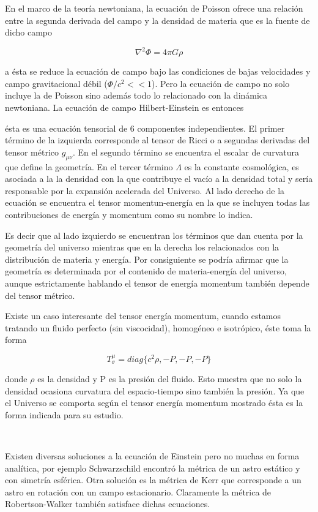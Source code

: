 En el marco de la teoría newtoniana, la ecuaci\'on de Poisson ofrece una 
relaci\'on entre la segunda derivada del campo y la densidad de materia 
que es la fuente de dicho campo

\[ \nabla^2\Phi=4\pi G\rho\]

a ésta se reduce la ecuación de campo bajo las condiciones de bajas velocidades 
y campo gravitacional débil ($\Phi/c^2<< 1$). 
Pero la ecuación de campo no solo incluye la de Poisson sino además todo lo 
relacionado con la dinámica newtoniana. La ecuación de campo Hilbert-Einstein es 
entonces


ésta es una ecuaci\'on tensorial de 6 componentes independientes. 
El primer t\'ermino de la izquierda corresponde al tensor de Ricci 
o a segundas derivadas del tensor m\'etrico $g_{\mu\nu}$. 
En el segundo t\'ermino se encuentra el escalar de curvatura 
que define la geometr\'ia. 
En el tercer t\'ermino $\Lambda$ es la constante cosmol\'ogica, 
es asociada a la la densidad con la que contribuye el vacío a 
la densidad total y sería responsable por la expansión acelerada del 
Universo. 
Al lado derecho de la ecuación se encuentra el tensor momentun-energ\'ia 
en la que se incluyen todas las contribuciones de energía y momentum 
como su nombre lo indica.

Es decir que al lado izquierdo se encuentran los t\'erminos que dan 
cuenta por la geometr\'ia del universo mientras que en la derecha 
los relacionados con la distribuci\'on de materia y e\-ner\-gía. 
Por consiguiente se podría afirmar que la geometr\'ia es determinada por 
el contenido de materia-energ\'ia del universo, aunque estrictamente 
hablando el tensor de energ\'ia momentum tambi\'en depende del tensor m\'etrico. 

Existe un caso interesante del tensor energía momentum, 
cuando estamos tratando un fluido perfecto (sin viscocidad), homogéneo
e isotrópico, éste toma la forma 

\[T^{\mu}_{\sigma}= diag\{c^2\rho,-P,-P,-P\}\]

donde $\rho$ es la densidad y P es la presi\'on del fluido. 
Esto muestra que no solo la densidad ocasiona curvatura del 
espacio-tiempo sino tambi\'en la presi\'on. Ya que el Universo se comporta según
el tensor energía momentum mostrado ésta es la forma indicada para 
su estudio.

\

Existen diversas soluciones a la ecuación de Einstein 
pero no muchas en forma analítica, por ejemplo Schwarzschild encontró 
la m\'etrica de un astro est\'atico y con simetría esférica. 
Otra soluci\'on es la m\'etrica de Kerr que corresponde a un astro en 
rotaci\'on con un campo estacionario. 
Claramente la m\'etrica de Robertson-Walker también satisface dichas ecuaciones.

